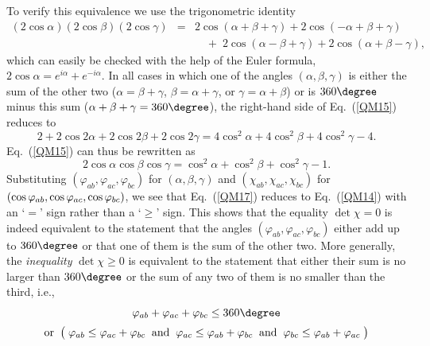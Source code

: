 To verify this equivalence we use the trigonometric identity
\begin{eqnarray}
(2 \cos{\alpha}) (2 \cos{\beta}) (2 \cos{\gamma}) & \! \!  = \! \!  & 2 \cos{(\alpha + \beta + \gamma)}
+ 2 \cos{(- \alpha + \beta + \gamma)} \nonumber \\
 & & \quad  + \; 2 \cos{(\alpha - \beta + \gamma)} + 2 \cos{(\alpha + \beta - \gamma)}, 
\label{QM15}
\end{eqnarray}
which can easily be checked with the help of the Euler formula, $2 \cos{\alpha} = e^{i \alpha} + e^{-i \alpha}$. In all cases in which one of the angles $(\alpha, \beta, \gamma)$ is either the sum of the other two ($\alpha = \beta + \gamma$, $\beta = \alpha + \gamma$, or $\gamma = \alpha + \beta$) or is $360\degree$ minus this sum ($\alpha+\beta+\gamma=360\degree$), the right-hand side of Eq.\ (\ref{QM15}) reduces to
\begin{equation}
2 + 2 \cos{2 \alpha} + 2 \cos{2 \beta} + 2 \cos{2 \gamma}
= 4 \cos^2{\! \alpha} + 4 \cos^2{\!\beta} + 4 \cos^2{\!\gamma} - 4.
 \label{QM16}
\end{equation}
Eq.\ (\ref{QM15}) can thus be rewritten as
\begin{equation}
2 \cos{\alpha} \cos{\beta} \cos{\gamma} = \cos^2{\!\alpha} + \cos^2{\!\beta} + \cos^2{\!\gamma} - 1.
\label{QM17}
\end{equation}
Substituting $(\varphi_{ab}, \varphi_{ac}, \varphi_{bc})$ for  $(\alpha, \beta, \gamma)$ and $(\chi_{ab}, \chi_{ac}, \chi_{bc})$ for  $(\cos{\varphi_{ab}}, \break \cos{\varphi_{ac}}, \cos{\varphi_{bc}})$, 
we see that Eq.\ (\ref{QM17}) reduces to Eq.\ (\ref{QM14}) with an `$=$' sign rather than a `$\ge$' sign. This shows that the equality $\det{\chi} =0$ is indeed equivalent to the statement that the angles $(\varphi_{ab}, \varphi_{ac}, \varphi_{bc})$ either add up to $360\degree$ or that one of them is the sum of the other two. More generally, the \emph{inequality} $\det \chi\geq 0$ is equivalent to the statement that either their sum is no larger than $360\degree$ or the sum of any two of them is no smaller than the third, i.e.,  
\begin{equation}
\begin{array}{c}
 \varphi_{ab} +  \varphi_{ac} + \varphi_{bc} \le 360\degree  \\[.2cm]
\mathrm{or} \;\; \big( \; \varphi_{ab} \le  \varphi_{ac} + \varphi_{bc} \;\; \mathrm{and} \;\; \varphi_{ac} \le  \varphi_{ab} + \varphi_{bc}  \;\;  \mathrm{and} \;\; \varphi_{bc} \le  \varphi_{ab} + \varphi_{ac} \; \big) 
\end{array}
\label{angle inequalities}
\end{equation}
